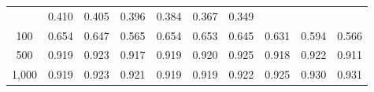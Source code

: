 \documentclass{article}
\numberwithin{equation}{section}
\begin{document}
\begin{table}[ht]
\begin{tabular}{c|ccc|cccccc}
& 0.410 & 0.405 & 0.396 & 0.384 & 0.367 & 0.349 \\
100
& 0.654 & 0.647 & 0.565
& 0.654 & 0.653 & 0.645 & 0.631 & 0.594 & 0.566 \\
500
& \cellcolor{covheat!85!white}0.919 & \cellcolor{covheat!87!white}0.923 & \cellcolor{covheat!84!white}0.917
& \cellcolor{covheat!85!white}0.919 & \cellcolor{covheat!85!white}0.920 & \cellcolor{covheat!88!white}0.925 & \cellcolor{covheat!84!white}0.918 & \cellcolor{covheat!86!white}0.922 & \cellcolor{covheat!81!white}0.911 \\
1{,}000
& \cellcolor{covheat!85!white}0.919 & \cellcolor{covheat!87!white}0.923 & \cellcolor{covheat!86!white}0.921
& \cellcolor{covheat!85!white}0.919 & \cellcolor{covheat!85!white}0.919 & \cellcolor{covheat!86!white}0.922 & \cellcolor{covheat!88!white}0.925 & \cellcolor{covheat!90!white}0.930 & \cellcolor{covheat!91!white}0.931 \\
\hline
\end{tabular}
\end{table}
\end{document}
